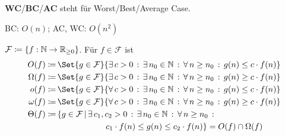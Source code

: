 \documentclass{cheat-sheet}
\begin{document}

\theoremstyle{definition}
\newtheorem*{definition}{Definition}
\newtheorem*{datenstruktur}{Datenstruktur}

\begin{abk}
  \textbf{WC}/\textbf{BC}/\textbf{AC} steht für Worst/Best/Average Case.
\end{abk}




\begin{alg}
  BC: $O(n)$; AC, WC: $O(n^2)$
\end{alg}

\begin{nota}
  $\mathcal{F} \coloneqq \{ f : \mathbb{N} \to \mathbb{R}_{\geq 0} \}$.
  Für $f \in \mathcal{F}$ ist
  \begin{align*}
         O(f) \coloneqq& \, \Set{ g \in \mathcal{F} }{ \ex{c > 0} \ex{n_0 \in \N} \fa{n \geq n_0} g(n) \leq c \cdot f(n) } \\
    \Omega(f) \coloneqq& \, \Set{ g \in \mathcal{F} }{ \ex{c > 0} \ex{n_0 \in \N} \fa{n \geq n_0} g(n) \geq c \cdot f(n) } \\
         o(f) \coloneqq& \, \Set{ g \in \mathcal{F} }{ \fa{c > 0} \ex{n_0 \in \N} \fa{n \geq n_0} g(n) \leq c \cdot f(n) } \\
    \omega(f) \coloneqq& \, \Set{ g \in \mathcal{F} }{ \fa{c > 0} \ex{n_0 \in \N} \fa{n \geq n_0} g(n) \geq c \cdot f(n) } \\
    \Theta(f) \coloneqq& \, \{ g \in \mathcal{F} \,|\, \ex{c_1, c_2 > 0} \ex{n_0 \in \N} \fa{n \geq n_0} \\
    & \qquad \qquad \qquad c_1 \cdot f(n) \leq g(n) \leq c_2 \cdot f(n) \}
              = O(f) \cap \Omega(f) \\
  \end{align*}
\end{nota}
\end{document}
